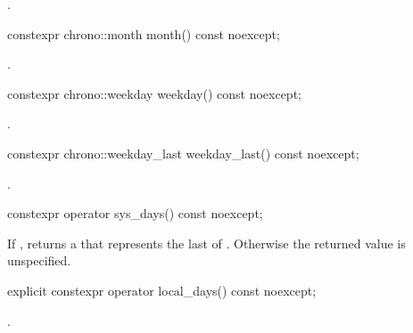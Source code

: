 \begin{itemdescr}
\pnum
\returns {}.
\end{itemdescr}

%
\begin{itemdecl}
constexpr chrono::month month() const noexcept;
\end{itemdecl}

\begin{itemdescr}
\pnum
\returns {}.
\end{itemdescr}

%
\begin{itemdecl}
constexpr chrono::weekday weekday() const noexcept;
\end{itemdecl}

\begin{itemdescr}
\pnum
\returns {}.
\end{itemdescr}

%
\begin{itemdecl}
constexpr chrono::weekday_last weekday_last() const noexcept;
\end{itemdecl}

\begin{itemdescr}
\pnum
\returns {}.
\end{itemdescr}

%
\begin{itemdecl}
constexpr operator sys_days() const noexcept;
\end{itemdecl}

\begin{itemdescr}
\pnum
\returns
If ,
returns a  that represents
the last  of .
Otherwise the returned value is unspecified.
\end{itemdescr}

%
\begin{itemdecl}
explicit constexpr operator local_days() const noexcept;
\end{itemdecl}

\begin{itemdescr}
\pnum
\returns {}.
\end{itemdescr}

